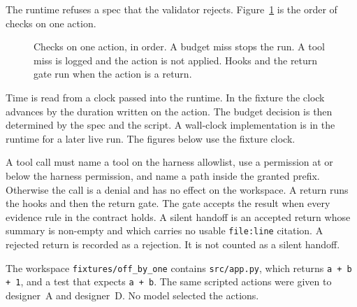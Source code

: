 \documentclass[10pt,a4paper]{article}
\begin{document}
The runtime refuses a spec that the validator rejects. Figure~\ref{fig:checks} is the order of checks on one action.

\begin{figure}[H]
\centering
{}
\caption{Checks on one action, in order. A budget miss stops the run. A tool miss is logged and the action is not applied. Hooks and the return gate run when the action is a return.}
\label{fig:checks}
\end{figure}

Time is read from a clock passed into the runtime. In the fixture the clock advances by the duration written on the action. The budget decision is then determined by the spec and the script. A wall-clock implementation is in the runtime for a later live run. The figures below use the fixture clock.

A tool call must name a tool on the harness allowlist, use a permission at or below the harness permission, and name a path inside the granted prefix. Otherwise the call is a denial and has no effect on the workspace. A return runs the hooks and then the return gate. The gate accepts the result when every evidence rule in the contract holds. A silent handoff is an accepted return whose summary is non-empty and which carries no usable \texttt{file:line} citation. A rejected return is recorded as a rejection. It is not counted as a silent handoff.

The workspace \texttt{fixtures/off\_by\_one} contains \texttt{src/app.py}, which returns \texttt{a + b + 1}, and a test that expects \texttt{a + b}. The same scripted actions were given to designer~A and designer~D. No model selected the actions.
\end{document}
